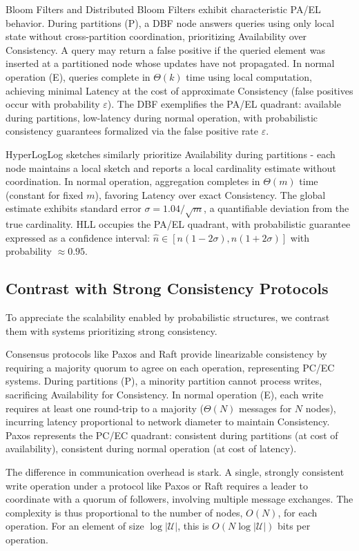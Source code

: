 Bloom Filters and Distributed Bloom Filters exhibit characteristic PA/EL behavior. During partitions (P), a DBF node answers queries using only local state without cross-partition coordination, prioritizing Availability over Consistency. A query may return a false positive if the queried element was inserted at a partitioned node whose updates have not propagated. In normal operation (E), queries complete in $\Theta(k)$ time using local computation, achieving minimal Latency at the cost of approximate Consistency (false positives occur with probability $\varepsilon$). The DBF exemplifies the PA/EL quadrant: available during partitions, low-latency during normal operation, with probabilistic consistency guarantees formalized via the false positive rate $\varepsilon$.

HyperLogLog sketches similarly prioritize Availability during partitions - each node maintains a local sketch and reports a local cardinality estimate without coordination. In normal operation, aggregation completes in $\Theta(m)$ time (constant for fixed $m$), favoring Latency over exact Consistency. The global estimate exhibits standard error $\sigma = 1.04/\sqrt{m}$, a quantifiable deviation from the true cardinality. HLL occupies the PA/EL quadrant, with probabilistic guarantee expressed as a confidence interval: $\hat{n} \in [n(1 - 2\sigma), n(1 + 2\sigma)]$ with probability $\approx 0.95$.

\subsection{Contrast with Strong Consistency Protocols}

To appreciate the scalability enabled by probabilistic structures, we contrast them with systems prioritizing strong consistency.

Consensus protocols like Paxos and Raft provide linearizable consistency by requiring a majority quorum to agree on each operation, representing PC/EC systems. During partitions (P), a minority partition cannot process writes, sacrificing Availability for Consistency. In normal operation (E), each write requires at least one round-trip to a majority ($\Theta(N)$ messages for $N$ nodes), incurring latency proportional to network diameter to maintain Consistency. Paxos represents the PC/EC quadrant: consistent during partitions (at cost of availability), consistent during normal operation (at cost of latency).

The difference in communication overhead is stark. A single, strongly consistent write operation under a protocol like Paxos or Raft requires a leader to coordinate with a quorum of followers, involving multiple message exchanges. The complexity is thus proportional to the number of nodes, $O(N)$, for each operation. For an element of size $\log|\mathcal{U}|$, this is $O(N \log|\mathcal{U}|)$ bits per operation.

